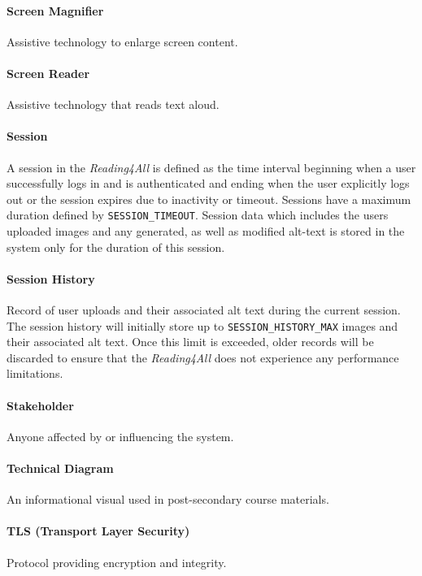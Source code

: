 \documentclass[12pt, titlepage]{article}
\begin{document}
\paragraph*{Screen Magnifier}
Assistive technology to enlarge screen content.

\paragraph*{Screen Reader}
Assistive technology that reads text aloud.

\paragraph*{Session}
A session in the \textit{Reading4All} is defined as the time interval beginning
when a user successfully logs in and is authenticated and ending when the user explicitly logs out or the session expires due to inactivity or timeout. 
Sessions have a maximum duration defined by \texttt{SESSION\_TIMEOUT}.
Session data which includes the users uploaded images and any generated, as well as modified alt-text is stored in the system only for the duration of this session.

\paragraph*{Session History}
Record of user uploads and their associated alt text during the current session. The session history 
will initially store up to \texttt{SESSION\_HISTORY\_MAX} images and their associated alt text. Once this limit is exceeded, older records will be discarded to ensure that 
the \textit{Reading4All} does not experience any performance limitations. 

\paragraph*{Stakeholder}
Anyone affected by or influencing the system.

\paragraph*{Technical Diagram}
An informational visual used in post-secondary course materials.

\paragraph*{TLS (Transport Layer Security)}
Protocol providing encryption and integrity.
\end{document}
